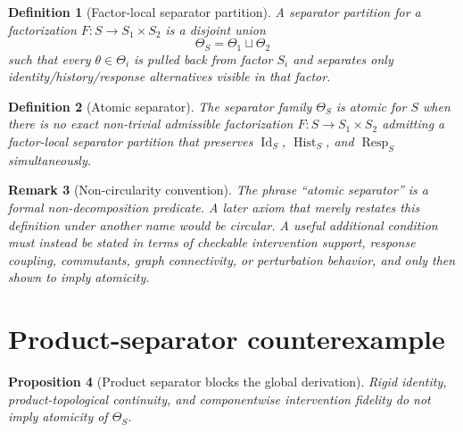 \documentclass[11pt]{article}
\newtheorem{definition}{Definition}[section]
\newtheorem{proposition}[definition]{Proposition}
\newtheorem{remark}[definition]{Remark}
\newcommand{\Id}{\operatorname{Id}}
\newcommand{\Hist}{\operatorname{Hist}}
\newcommand{\Resp}{\operatorname{Resp}}
\begin{document}
\begin{definition}[Factor-local separator partition]
A separator partition for a factorization $F:S\to S_1\times S_2$ is a disjoint union
\[
  \Theta_S = \Theta_1\sqcup\Theta_2
\]
such that every $\theta\in\Theta_i$ is pulled back from factor $S_i$ and separates only identity/history/response alternatives visible in that factor.
\end{definition}

\begin{definition}[Atomic separator]
The separator family $\Theta_S$ is atomic for $S$ when there is no exact non-trivial admissible factorization $F:S\to S_1\times S_2$ admitting a factor-local separator partition that preserves $\Id_S$, $\Hist_S$, and $\Resp_S$ simultaneously.
\end{definition}

\begin{remark}[Non-circularity convention]
The phrase ``atomic separator'' is a formal non-decomposition predicate. A later axiom that merely restates this definition under another name would be circular. A useful additional condition must instead be stated in terms of checkable intervention support, response coupling, commutants, graph connectivity, or perturbation behavior, and only then shown to imply atomicity.
\end{remark}

\section{Product-separator counterexample}

\begin{proposition}[Product separator blocks the global derivation]
Rigid identity, product-topological continuity, and componentwise intervention fidelity do not imply atomicity of $\Theta_S$.
\end{proposition}
\end{document}
